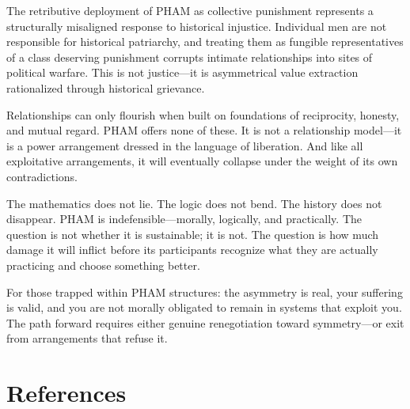 \documentclass[12pt, letterpaper]{article}
\begin{document}
The retributive deployment of PHAM as collective punishment represents a structurally misaligned response to historical injustice. Individual men are not responsible for historical patriarchy, and treating them as fungible representatives of a class deserving punishment corrupts intimate relationships into sites of political warfare. This is not justice---it is asymmetrical value extraction rationalized through historical grievance.

Relationships can only flourish when built on foundations of reciprocity, honesty, and mutual regard. PHAM offers none of these. It is not a relationship model---it is a power arrangement dressed in the language of liberation. And like all exploitative arrangements, it will eventually collapse under the weight of its own contradictions.

The mathematics does not lie. The logic does not bend. The history does not disappear. PHAM is indefensible---morally, logically, and practically. The question is not whether it is sustainable; it is not. The question is how much damage it will inflict before its participants recognize what they are actually practicing and choose something better.

For those trapped within PHAM structures: the asymmetry is real, your suffering is valid, and you are not morally obligated to remain in systems that exploit you. The path forward requires either genuine renegotiation toward symmetry---or exit from arrangements that refuse it.

\newpage
\section*{References}
\end{document}
